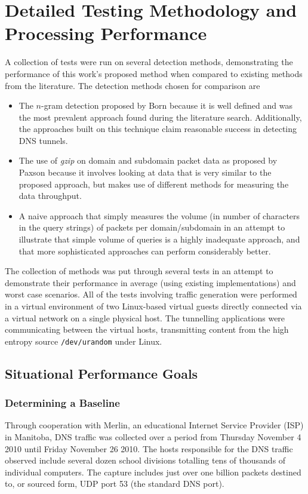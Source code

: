 \documentclass{llncs}
\begin{document}
\section{Detailed Testing Methodology and Processing Performance}
A collection of tests were run on several detection methods, demonstrating the
performance of this work's proposed method when compared to existing methods
from the literature. The detection methods chosen for comparison are

\label{chosen-methods}
\begin{itemize}

\item The $n$-gram detection proposed by Born\cite{Born2010.cfa} because it is
well defined and was the most prevalent approach found during the literature
search. Additionally, the approaches built on this technique claim reasonable
success in detecting DNS tunnels.

\item The use of \emph{gzip} on domain and subdomain packet data as proposed by
Paxson\cite{Paxson2011} because it involves looking at data that is very similar
to the proposed approach, but makes use of
different methods for measuring the data throughput.

\item A naive approach that simply measures the volume (in number of characters
in the query strings) of packets per domain/subdomain in an attempt to
illustrate that simple volume of queries is a highly inadequate approach, and
that more sophisticated approaches can perform considerably better.
\end{itemize}

The collection of methods was put through several tests in an attempt to
demonstrate their performance in average (using existing implementations) and
worst case scenarios. All of the tests involving traffic generation were
performed in a virtual environment of two Linux-based virtual guests directly
connected via a virtual network on a single physical host. The tunnelling
applications were communicating between the virtual hosts, transmitting content
from the high entropy source \texttt{/dev/urandom} under Linux.

\subsection{Situational Performance Goals}
\subsubsection{Determining a Baseline}
\label{baseline}
Through cooperation with Merlin, an educational Internet Service Provider (ISP)
in Manitoba, DNS traffic was collected over a period from Thursday November 4
2010 until Friday November 26 2010. The hosts responsible for the DNS traffic
observed include several dozen school divisions totalling tens of thousands of
individual computers. The capture includes just over one billion packets
destined to, or sourced form, UDP port 53 (the standard DNS port).
\end{document}
